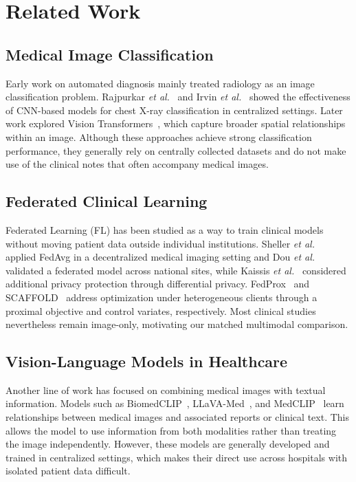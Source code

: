 \documentclass[letterpaper, conference]{IEEEtran}
\begin{document}
\section{Related Work}

\subsection{Medical Image Classification}
Early work on automated diagnosis mainly treated radiology as an image classification problem. Rajpurkar \textit{et al.}~\cite{Rajpurkar2017} and Irvin \textit{et al.}~\cite{Irvin2019} showed the effectiveness of CNN-based models for chest X-ray classification in centralized settings. Later work explored Vision Transformers~\cite{Dosovitskiy2021,Liu2021swin}, which capture broader spatial relationships within an image. Although these approaches achieve strong classification performance, they generally rely on centrally collected datasets and do not make use of the clinical notes that often accompany medical images.

\subsection{Federated Clinical Learning}
Federated Learning (FL) has been studied as a way to train clinical models without moving patient data outside individual institutions. Sheller \textit{et al.}~\cite{Sheller2020} applied FedAvg in a decentralized medical imaging setting and Dou \textit{et al.}~\cite{Dou2021} validated a federated model across national sites, while Kaissis \textit{et al.}~\cite{Kaissis2021} considered additional privacy protection through differential privacy. FedProx~\cite{Li2020fedprox} and SCAFFOLD~\cite{Karimireddy2020} address optimization under heterogeneous clients through a proximal objective and control variates, respectively. Most clinical studies nevertheless remain image-only, motivating our matched multimodal comparison.

\subsection{Vision-Language Models in Healthcare}
Another line of work has focused on combining medical images with textual information. Models such as BiomedCLIP~\cite{Zhang2023biomedclip}, LLaVA-Med~\cite{Li2023llavamed}, and MedCLIP~\cite{Wang2022medclip} learn relationships between medical images and associated reports or clinical text. This allows the model to use information from both modalities rather than treating the image independently. However, these models are generally developed and trained in centralized settings, which makes their direct use across hospitals with isolated patient data difficult.
\end{document}
